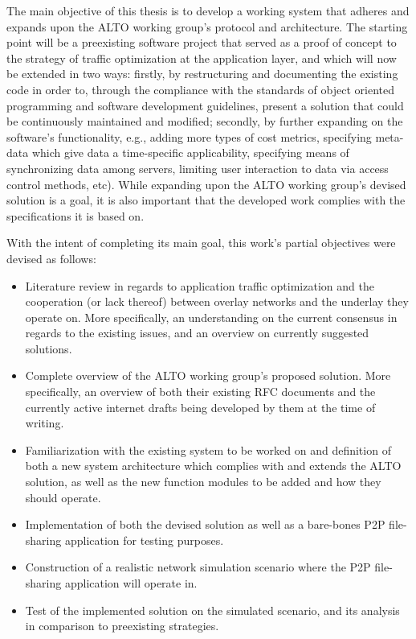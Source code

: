    The main objective of this thesis is to develop a working system that adheres and expands upon the ALTO working group's protocol and architecture.
    The starting point will be a preexisting software project that served as a proof of concept to the strategy of traffic optimization at the application layer, and which will now be extended in two ways: firstly, by restructuring and documenting the existing code in order to, through the compliance with the standards of object oriented programming and software development guidelines, present a solution that could be continuously maintained and modified; secondly, by further expanding on the software's functionality, e.g., adding more types of cost metrics, specifying meta-data which give data a time-specific applicability, specifying means of synchronizing data among servers, limiting user interaction to data via access control methods, etc). While expanding upon the ALTO working group's devised solution is a goal, it is also important that the developed work complies with the specifications it is based on.

    With the intent of completing its main goal, this work's partial objectives were devised as follows:

\begin{itemize}
    \item Literature review in regards to application traffic optimization and the cooperation (or lack thereof) between overlay networks and the underlay they operate on. More specifically, an understanding on the current consensus in regards to the existing issues, and an overview on currently suggested solutions.
    \item Complete overview of the ALTO working group's proposed solution. More specifically, an overview of both their existing RFC documents and the currently active internet drafts being developed by them at the time of writing.
    \item Familiarization with the existing system to be worked on and definition of both a new system architecture which complies with and extends the ALTO solution, as well as the new function modules to be added and how they should operate.
    \item Implementation of both the devised solution as well as a bare-bones P2P file-sharing application for testing purposes.
    \item Construction of a realistic network simulation scenario where the P2P file-sharing application will operate in.
    \item Test of the implemented solution on the simulated scenario, and its analysis in comparison to preexisting strategies.
\end{itemize}
